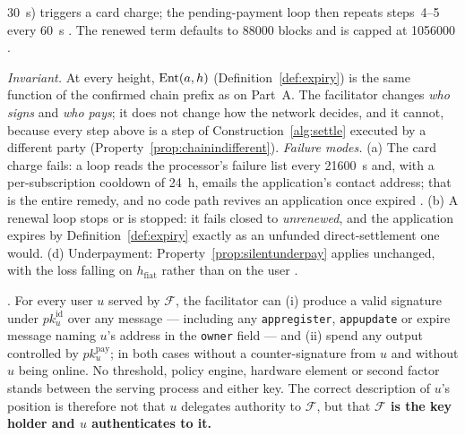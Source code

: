 \begin{construction}
\begin{enumerate}
      \qty{30}{\second}) triggers a card charge; the pending-payment loop then repeats steps~4--5
      every \qty{60}{\second}
      .
      The renewed term defaults to \num{88000} blocks and is capped at \num{1056000}
      .
\end{enumerate}
\emph{Invariant.} At every height, $\mathrm{Ent}(a,h)$ (Definition~\ref{def:expiry}) is the
same function of the confirmed chain prefix as on Part~A. The facilitator changes \emph{who signs}
and \emph{who pays}; it does not change how the network decides, and it cannot, because every step
above is a step of Construction~\ref{alg:settle} executed by a different party
(Property~\ref{prop:chainindifferent}).\quad
\emph{Failure modes.} (a) The card charge fails: a loop reads the processor's failure list every
\qty{21600}{\second} and, with a per-subscription cooldown of \qty{24}{\hour}, emails the
application's contact address; that is the entire remedy, and no code path revives an application
once expired .
(b) A renewal loop stops or is stopped: it fails closed to \emph{unrenewed}, and the application
expires by Definition~\ref{def:expiry} exactly as an unfunded direct-settlement one would.
(d) Underpayment: Property~\ref{prop:silentunderpay} applies unchanged, with the loss falling on
$h_{\mathrm{fiat}}$ rather than on the user \srcinferred.
\end{construction}

\begin{property}
\label{prop:custody}
\shipped. For every user $u$ served by $\mathcal{F}$, the facilitator can (i) produce a valid
signature under $pk^{\mathrm{id}}_u$ over any message --- including any \texttt{appregister},
\texttt{appupdate} or expire message naming $u$'s address in the \texttt{owner} field --- and
(ii) spend any output controlled by $pk^{\mathrm{pay}}_u$; in both cases without a counter-signature
from $u$ and without $u$ being online. No threshold, policy engine, hardware element or second
factor stands between the serving process and either key. The correct description of $u$'s position
is therefore not that $u$ delegates authority to $\mathcal{F}$, but that \textbf{$\mathcal{F}$ is
the key holder and $u$ authenticates to it.}
\end{property}

